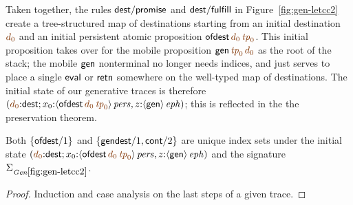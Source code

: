 Taken together, the rules ${\sf dest/promise}$ and ${\sf
  dest/fulfill}$ in Figure~\ref{fig:gen-letcc2} create a
tree-structured map of destinations starting from an initial
destination $\lf{d_0}$ and an initial persistent atomic proposition
${\sf ofdest}\,\lf{d_0}\,\lf{{\it tp}_0}$. This initial proposition
takes over for the mobile proposition ${\sf gen}\,\lf{{\it
    tp}_0}\,\lf{d_0}$ as the root of the stack; the mobile ${\sf gen}$
nonterminal no longer needs indices, and just serves to place a single
${\sf eval}$ or ${\sf retn}$ somewhere on the well-typed map of
destinations. The initial state of our generative traces is therefore
$\left(\lf{d_0}{:}{\sf dest}; x_0{:}\ispers{\susp{{\sf
        ofdest}\,\lf{d_0}\,\lf{{\it tp}_0}}}, z{:}\iseph{\susp{{\sf
        gen}}}\right)$; this is reflected in the the preservation
theorem.

\bigskip
\begin{lemma} Both $\{ {\sf
    ofdest}/1 \}$ and $\{ {\sf gendest}/1, {\sf cont}/2 \}$ are unique
  index sets under the initial state
  $\left(\lf{d_0}{:}{\sf dest}; x_0{:}\ispers{\susp{{\sf
          ofdest}\,\lf{d_0}\,\lf{{\it tp}_0}}}, z{:}\iseph{\susp{{\sf gen}}}\right)$ and the signature $\siggenletcc$.
\end{lemma}

\begin{proof}
Induction and case analysis on the last steps of a given trace.
\end{proof}

